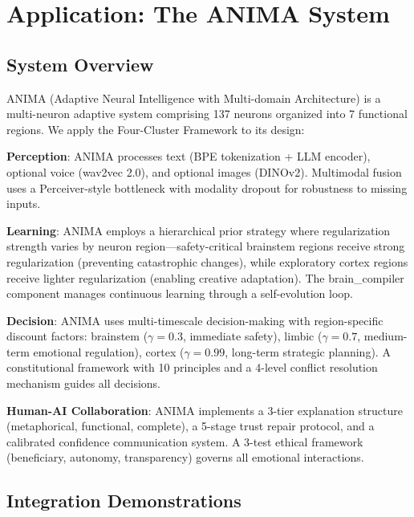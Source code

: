 \documentclass[11pt,a4paper]{article}
\begin{document}
\section{Application: The ANIMA System}

\subsection{System Overview}

ANIMA (Adaptive Neural Intelligence with Multi-domain Architecture) is a multi-neuron adaptive system comprising 137 neurons organized into 7 functional regions. We apply the Four-Cluster Framework to its design:

\textbf{Perception}: ANIMA processes text (BPE tokenization + LLM encoder), optional voice (wav2vec 2.0), and optional images (DINOv2). Multimodal fusion uses a Perceiver-style bottleneck with modality dropout for robustness to missing inputs.

\textbf{Learning}: ANIMA employs a hierarchical prior strategy where regularization strength varies by neuron region---safety-critical brainstem regions receive strong regularization (preventing catastrophic changes), while exploratory cortex regions receive lighter regularization (enabling creative adaptation). The brain\_compiler component manages continuous learning through a self-evolution loop.

\textbf{Decision}: ANIMA uses multi-timescale decision-making with region-specific discount factors: brainstem ($\gamma=0.3$, immediate safety), limbic ($\gamma=0.7$, medium-term emotional regulation), cortex ($\gamma=0.99$, long-term strategic planning). A constitutional framework with 10 principles and a 4-level conflict resolution mechanism guides all decisions.

\textbf{Human-AI Collaboration}: ANIMA implements a 3-tier explanation structure (metaphorical, functional, complete), a 5-stage trust repair protocol, and a calibrated confidence communication system. A 3-test ethical framework (beneficiary, autonomy, transparency) governs all emotional interactions.

\subsection{Integration Demonstrations}
\end{document}
